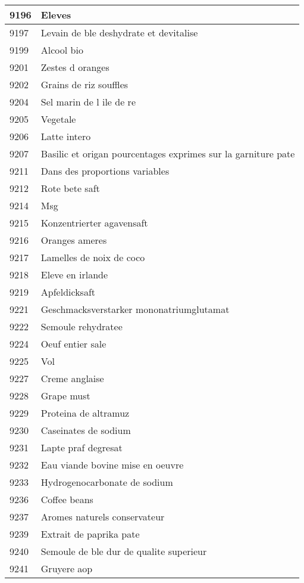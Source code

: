 \begin{longtable}{|l|l|}
9196 & Eleves \\ \hline 
9197 & Levain de ble deshydrate et devitalise \\ \hline 
9199 & Alcool bio \\ \hline 
9201 & Zestes d oranges \\ \hline 
9202 & Grains de riz souffles \\ \hline 
9204 & Sel marin de l ile de re \\ \hline 
9205 & Vegetale \\ \hline 
9206 & Latte intero \\ \hline 
9207 & Basilic et origan pourcentages exprimes sur la garniture pate \\ \hline 
9211 & Dans des proportions variables \\ \hline 
9212 & Rote bete saft \\ \hline 
9214 & Msg \\ \hline 
9215 & Konzentrierter agavensaft \\ \hline 
9216 & Oranges ameres \\ \hline 
9217 & Lamelles de noix de coco \\ \hline 
9218 & Eleve en irlande \\ \hline 
9219 & Apfeldicksaft \\ \hline 
9221 & Geschmacksverstarker mononatriumglutamat \\ \hline 
9222 & Semoule rehydratee \\ \hline 
9224 & Oeuf entier sale \\ \hline 
9225 & Vol \\ \hline 
9227 & Creme anglaise \\ \hline 
9228 & Grape must \\ \hline 
9229 & Proteina de altramuz \\ \hline 
9230 & Caseinates de sodium \\ \hline 
9231 & Lapte praf degresat \\ \hline 
9232 & Eau viande bovine mise en oeuvre \\ \hline 
9233 & Hydrogenocarbonate de sodium \\ \hline 
9236 & Coffee beans \\ \hline 
9237 & Aromes naturels conservateur \\ \hline 
9239 & Extrait de paprika pate \\ \hline 
9240 & Semoule de ble dur de qualite superieur \\ \hline 
9241 & Gruyere aop \\ \hline 

\end{longtable}

